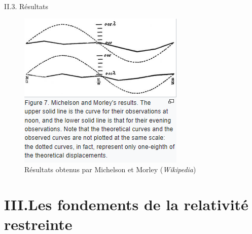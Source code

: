 \documentclass{beamer}
\begin{document}
\begin{frame}{II.3. Résultats}
    \begin{block}{}
        \begin{figure}
            \centering
            \includegraphics[width=.5\textwidth]{resultsMichelsonMorley.png}
            \caption{Résultats obtenus par Michelson et Morley (\textit{Wikipedia})}
        \end{figure}
    \end{block}
\end{frame}

\section{III.Les fondements de la relativité restreinte}
\end{document}
